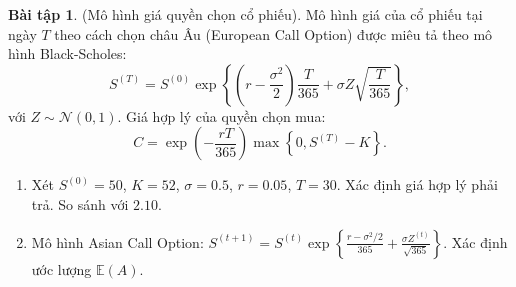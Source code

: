 \documentclass[12pt,xcolor=dvipsnames]{article}
\date{}
\theoremstyle{definition}
\newtheorem{bt}{Bài tập}
\begin{document}
\begin{bt}
(Mô hình giá quyền chọn cổ phiếu). Mô hình giá của cổ phiếu tại ngày $T$ theo cách chọn châu Âu (European Call Option) được miêu tả theo mô hình Black-Scholes:
\[
S^{(T)} = S^{(0)} \exp\left\{\left(r - \frac{\sigma^2}{2}\right)\frac{T}{365} + \sigma Z \sqrt{\frac{T}{365}}\right\},
\]
với $Z \sim \mathcal{N}(0,1)$. Giá hợp lý của quyền chọn mua:
\[
C = \exp\left(-\frac{rT}{365}\right) \max\left\{0, S^{(T)} - K\right\}.
\]
\begin{enumerate}
    \item[(a)] Xét $S^{(0)}=50$, $K=52$, $\sigma=0.5$, $r=0.05$, $T=30$. Xác định giá hợp lý phải trả. So sánh với $2.10$.
    \item[(b)] Mô hình Asian Call Option: $S^{(t+1)} = S^{(t)}\exp\left\{\frac{r-\sigma^2/2}{365} + \frac{\sigma Z^{(t)}}{\sqrt{365}}\right\}$. Xác định ước lượng $\mathbb{E}(A)$.
\end{enumerate}
\end{bt}
\end{document}

